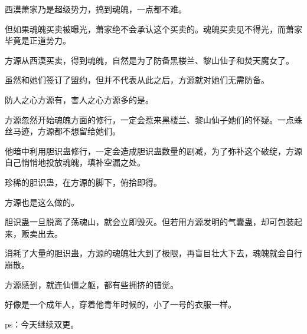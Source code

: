 \begin{this_body}
西漠萧家乃是超级势力，搞到魂魄，一点都不难。

但如果魂魄买卖被曝光，萧家绝不会承认这个买卖的。魂魄买卖见不得光，而萧家毕竟是正道势力。

方源从西漠买卖，得到魂魄，自然是为了防备黑楼兰、黎山仙子和焚天魔女了。

虽然和她们签订了盟约，但并不代表从此之后，方源就对她们无需防备。

防人之心方源有，害人之心方源多的是。

方源忽然开始魂魄方面的修行，一定会惹来黑楼兰、黎山仙子她们的怀疑。一点蛛丝马迹，方源都不想留给她们。

他暗中利用胆识蛊修行，一定会造成胆识蛊数量的剧减，为了弥补这个破绽，方源自己悄悄地投放魂魄，填补空漏之处。

珍稀的胆识蛊，在方源的脚下，俯拾即得。

方源也是这么做的。

胆识蛊一旦脱离了荡魂山，就会立即毁灭。但若用方源发明的气囊蛊，却可包装起来，贩卖出去。

消耗了大量的胆识蛊，方源的魂魄壮大到了极限，再盲目壮大下去，魂魄就会自行崩散。

方源感到，就连仙僵之躯，都有些拥挤的错觉。

好像是一个成年人，穿着他青年时候的，小了一号的衣服一样。

ps：今天继续双更。

\end{this_body}

